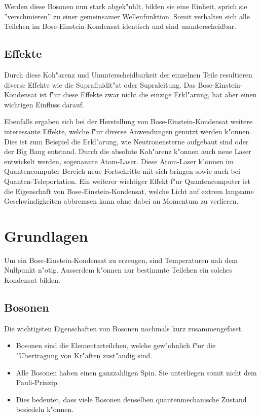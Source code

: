 \begin{refsection}
Werden diese Bosonen nun stark abgek"uhlt, bilden sie eine Einheit, sprich sie ''verschmieren'' zu einer gemeinsamer Wellenfunktion. Somit verhalten sich alle Teilchen im Bose-Einstein-Kondensat identisch und sind ununterscheidbar.

\subsection{Effekte}

Durch diese Koh"arenz und Ununterscheidbarkeit der einzelnen Teile resultieren diverse Effekte wie die Suprafluidit"at oder Supraleitung. Das Bose-Einstein-Kondensat ist f"ur diese Effekte zwar nicht die einzige Erkl"arung, hat aber einen wichtigen Einfluss darauf. 

Ebenfalls ergaben sich bei der Herstellung von Bose-Einstein-Kondensat weitere interessante Effekte, welche f"ur diverse Anwendungen genutzt werden k"onnen. Dies ist zum Beispiel die Erkl"arung, wie Neutronensterne aufgebaut sind oder der Big Bang entstand. Durch die absolute Koh"arenz k"onnen auch neue Laser entwickelt werden, sogenannte Atom-Laser. Diese Atom-Laser k"onnen im Quantencomputer Bereich neue Fortschritte mit sich bringen sowie auch bei Quanten-Teleportation. Ein weiterer wichtiger Effekt f"ur Quantencomputer ist die Eigenschaft von Bose-Einstein-Kondensat, welche Licht auf extrem langsame Geschwindigkeiten abbremsen kann ohne dabei an Momentum zu verlieren. 

\section{Grundlagen}

Um ein Bose-Einstein-Kondensat zu erzeugen, sind Temperaturen nah dem Nullpunkt n"otig. Ausserdem k"onnen nur bestimmte Teilchen ein solches Kondensat bilden.

\subsection{Bosonen}

Die wichtigsten Eigenschaften von Bosonen nochmals kurz zusammengefasst.

\begin{itemize}
    \item	Bosonen sind die Elementarteilchen, welche gew"ohnlich f"ur die
            "Ubertragung von Kr"aften zust"andig sind.	 
    \item	Alle Bosonen haben einen ganzzahligen Spin. Sie unterliegen
            somit nicht dem Pauli-Prinzip.
    \item	Dies bedeutet, dass viele Bosonen denselben
            quantenmechanische Zustand besiedeln k"onnen.
\end{itemize}


\end{refsection}

